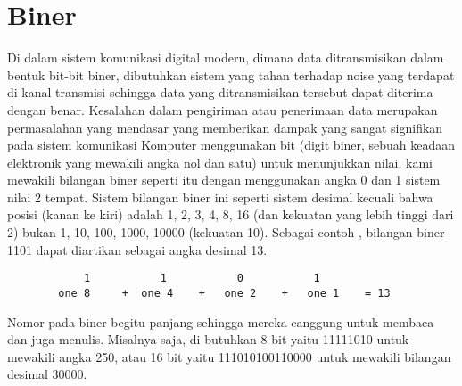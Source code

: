 \section {Biner}
	Di dalam sistem komunikasi digital modern, dimana data ditransmisikan dalam bentuk bit-bit biner, dibutuhkan sistem yang tahan terhadap noise yang terdapat di kanal transmisi sehingga data yang ditransmisikan tersebut dapat diterima dengan benar. Kesalahan dalam pengiriman atau penerimaan data merupakan permasalahan yang mendasar yang memberikan dampak yang sangat signifikan pada sistem komunikasi
	Komputer menggunakan bit (digit biner, sebuah keadaan elektronik yang mewakili angka nol dan satu) untuk menunjukkan nilai. kami mewakili bilangan biner seperti itu dengan menggunakan angka 0 dan 1 sistem nilai 2 tempat. Sistem bilangan biner ini seperti sistem desimal kecuali bahwa posisi (kanan ke kiri) adalah 1, 2, 3, 4, 8, 16 (dan kekuatan yang lebih tinggi dari 2) bukan 1, 10, 100, 1000, 10000 (kekuatan 10). Sebagai contoh , bilangan biner 1101 dapat diartikan sebagai angka desimal 13\cite{detmer2001introduction}.
		\begin{verbatim}
			1			1			0			1
		one 8	  +	 one 4	  +	  one 2    +   one 1 	= 13
		\end{verbatim}
	Nomor pada  biner begitu panjang sehingga mereka canggung  untuk membaca dan juga menulis. Misalnya saja, di butuhkan 8 bit yaitu  11111010 untuk mewakili angka 250, atau 16 bit yaitu 111010100110000 untuk mewakili bilangan desimal 30000.


